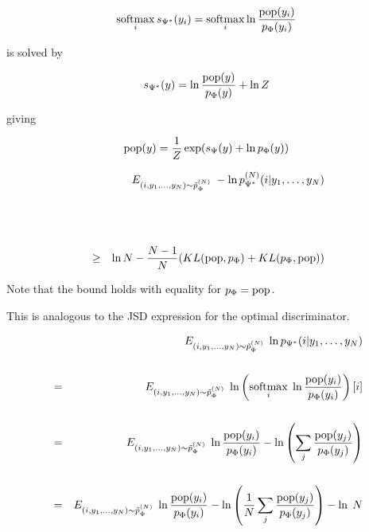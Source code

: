 {

$$\operatorname*{softmax}_i s_{\Psi^*}(y_i) =  \operatorname*{softmax}_i \ln \frac{\mathrm{pop}(y_i)}{p_\Phi(y_i)}$$

\vfill
is solved by

\vfill
$$s_{\Psi^*}(y) = \ln \frac{\mathrm{pop}(y)}{p_\Phi(y)} + \ln Z$$

\vfill
giving

$$\mathrm{pop}(y) = \frac{1}{Z} \exp(s_\Psi(y) + \ln p_\Phi(y))$$


}




\begin{eqnarray*}
  && E_{(i,y_1,\dots,y_{N}) \sim \tilde{p}_\Phi^{(N)}}\;- \ln p^{(N)}_{\Psi^*}(i|y_1,\ldots,y_{N}) \\
  \\
  \\
  \\
  & \geq & \ln N - \frac{N-1}{N}(KL(\mathrm{pop},p_\Phi) + KL(p_\Phi,\mathrm{pop}))
\end{eqnarray*}

\vfill
Note that the bound holds with equality for $p_\Phi = \mathrm{pop}$.

\vfill
This is analogous to the JSD expression for the optimal discriminator.

{\huge
 \begin{eqnarray*}
    & & E_{(i,y_1,\ldots,y_{N}) \sim \tilde{p}_\Phi^{(N)}}\;\ln p_{\Psi^*}(i|y_1,\ldots,y_{N}) \\
    \\
    & = & E_{(i,y_1,\ldots,y_{N}) \sim \tilde{p}_\Phi^{(N)}}\;\ln \left(\operatorname*{softmax}_i \;\ln \frac{\mathrm{pop}(y_i)}{p_\Phi(y_i)}\right)[i] \\
    \\
    & = & E_{(i,y_1,\ldots,y_{N}) \sim \tilde{p}_\Phi^{(N)}}\;\ln\frac{\mathrm{pop}(y_i)}{p_\Phi(y_i)} - \ln\left(\sum_j \frac{\mathrm{pop}(y_j)}{p_\Phi(y_j)} \right) \\
    \\
    & = & E_{(i,y_1,\ldots,y_{N}) \sim \tilde{p}_\Phi^{(N)}}\;\ln\frac{\mathrm{pop}(y_i)}{p_\Phi(y_i)} - \ln\left(\frac{1}{N}\sum_j \frac{\mathrm{pop}(y_j)}{p_\Phi(y_j)} \right) - \ln\;N
  \end{eqnarray*}
}

